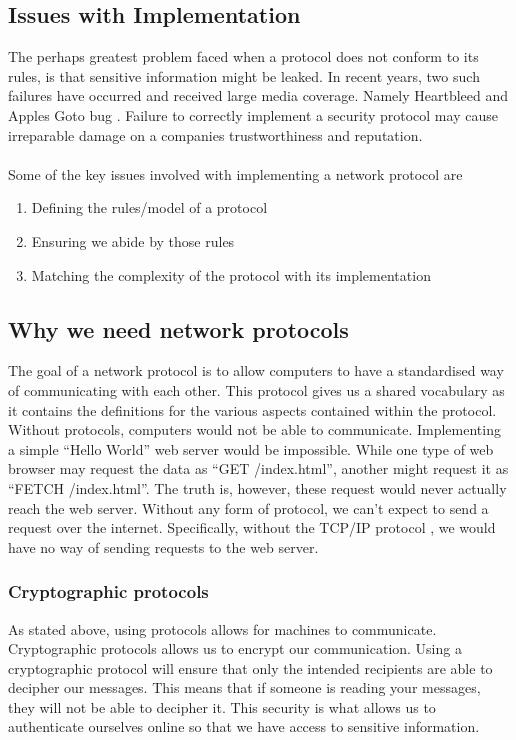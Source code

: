 \subsection{Issues with Implementation}
The perhaps greatest problem faced when a protocol does not conform to its rules, is that sensitive information might be leaked. In recent years, two such failures have occurred and received large media coverage. Namely Heartbleed \cite{durumeric2014matter} and Apples Goto bug \cite{bland2014finding}. Failure to correctly implement a security protocol may  cause irreparable damage on a companies trustworthiness and reputation.
\\\\
Some of the key issues involved with implementing a network protocol are
\begin{enumerate}
  \item Defining the rules/model of a protocol
  \item Ensuring we abide by those rules
  \item Matching the complexity of the protocol with its implementation
\end{enumerate}

\subsection{Why we need network protocols}
The goal of a network protocol is to allow computers to have a standardised way of communicating with each other. This protocol gives us a shared vocabulary as it contains the definitions for the various aspects contained within the protocol. Without protocols, computers would not be able to communicate. Implementing a simple ``Hello World'' web server would be impossible. While one type of web browser may request the data as ``GET /index.html'', another might request it as ``FETCH /index.html''. The truth is, however, these request would never actually reach the web server. Without any form of protocol, we can't expect to send a request over the internet. Specifically, without the TCP/IP protocol \cite{clark1988design}, we would have no way of sending requests to the web server.

\subsubsection{Cryptographic protocols}
As stated above, using protocols allows for machines to communicate. Cryptographic protocols allows us to encrypt our communication. Using a cryptographic protocol will ensure that only the intended recipients are able to decipher our messages. This means that if someone is reading your messages, they will not be able to decipher it. This security is what allows us to authenticate ourselves online so that we have access to sensitive information.

